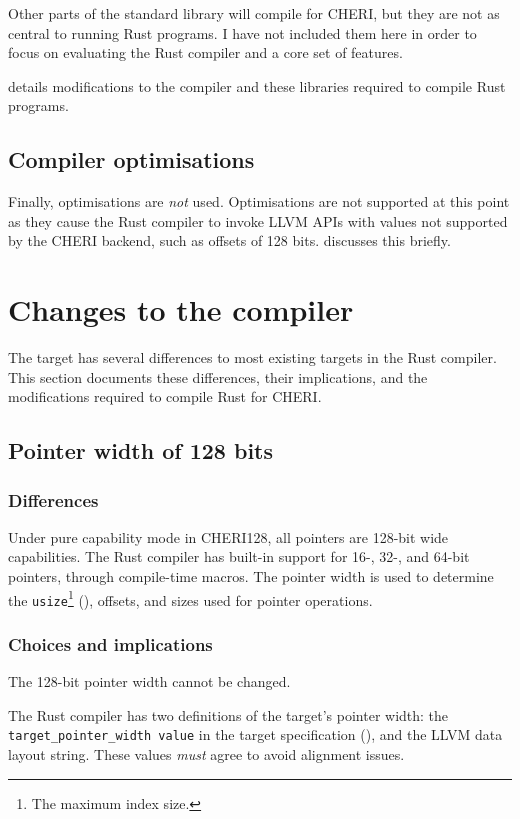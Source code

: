 \documentclass[dissertation.tex]{subfiles}
\begin{document}
Other parts of the standard library will compile for CHERI, but they are
not as central to running Rust programs.
I have not included them here in order to focus on evaluating the Rust
compiler and a core set of features.

 details modifications to the compiler and
these libraries required to compile Rust programs.

\subsection{Compiler optimisations}
Finally, optimisations are \emph{not} used.
Optimisations are not supported at this point as they cause the Rust
compiler to invoke LLVM APIs with values not supported by the CHERI
backend, such as offsets of 128 bits.
 discusses this briefly.


\section{Changes to the compiler}
\label{sec:impl-divergences}

The \cuf target has several differences to most existing targets in the
Rust compiler.
This section documents these differences, their implications, and the
modifications required to compile Rust for CHERI.


\subsection{Pointer width of 128 bits}
\label{sec:impl-width}

\subsubsection{Differences}
Under pure capability mode in CHERI128, all pointers are 128-bit wide
capabilities.
The Rust compiler has built-in support for 16-, 32-, and 64-bit
pointers, through compile-time macros.
The pointer width is used to determine the \texttt{usize}\footnote{The
maximum index size.} (), offsets, and sizes used
for pointer operations.

\subsubsection{Choices and implications}
The 128-bit pointer width cannot be changed.

The Rust compiler has two definitions of the target's pointer width: the
\texttt{target\_pointer\_width value} in the target specification
(), and the LLVM data layout string.
These values \emph{must} agree to avoid alignment issues.
\end{document}
